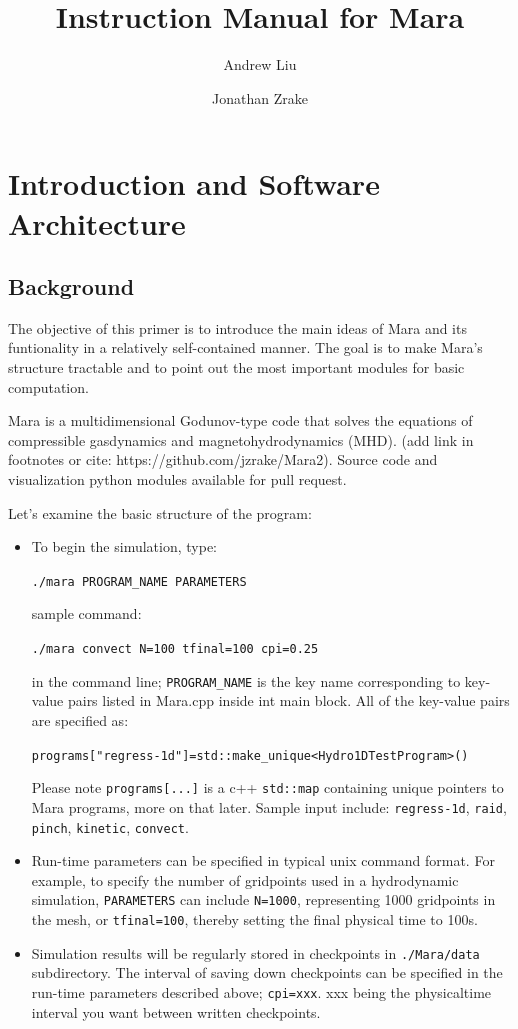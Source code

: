 \documentclass{article}
\title{Instruction Manual for Mara}
\author{Andrew Liu \and Jonathan Zrake}
\begin{document}
\maketitle

\section{Introduction and Software Architecture}
\subsection{Background}
The objective of this primer is to introduce the main ideas of Mara and its funtionality in a relatively self-contained manner. The goal is to make Mara's structure tractable and to point out the most important modules for basic computation.

Mara is a multidimensional Godunov-type code that solves the equations of
compressible gasdynamics and magnetohydrodynamics (MHD). (add link in footnotes or cite: https://github.com/jzrake/Mara2). Source code and visualization python modules available for pull request.

Let's examine the basic structure of the program:
\begin{itemize}
	\item To begin the simulation, type: 

	\texttt{./mara PROGRAM\_NAME PARAMETERS}

	sample command:

\texttt{./mara convect N=100 tfinal=100 cpi=0.25}
	
in the command line; \texttt{PROGRAM\_NAME} is the key name corresponding to key-value pairs listed in Mara.cpp inside int main block. All of the key-value pairs are specified as: 

\texttt{programs["regress-1d"]=std::make\_unique<Hydro1DTestProgram>()}

Please note \texttt{programs[...]} is a c++ \texttt{std::map} containing unique pointers to Mara programs, more on that later. Sample input include: \texttt{regress-1d}, \texttt{raid}, \texttt{pinch}, \texttt{kinetic}, \texttt{convect}.

	\item Run-time parameters can be specified in typical unix command format. For example, to specify the number of gridpoints used in a hydrodynamic simulation, \texttt{PARAMETERS} can include \texttt{N=1000}, representing 1000 gridpoints in the mesh, or \texttt{tfinal=100}, thereby setting the final physical time to 100s.  
	
	\item Simulation results will be regularly stored in checkpoints in \texttt{./Mara/data} subdirectory. The interval of saving down checkpoints can be specified in the run-time parameters described above; \texttt{cpi=xxx}. xxx being the physicaltime interval you want between written checkpoints.
\end{itemize}
\end{document}
